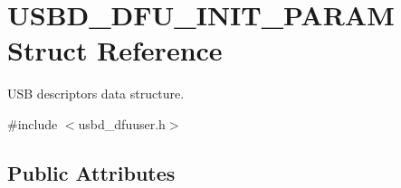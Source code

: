 \hypertarget{struct_u_s_b_d___d_f_u___i_n_i_t___p_a_r_a_m}{}\section{U\+S\+B\+D\+\_\+\+D\+F\+U\+\_\+\+I\+N\+I\+T\+\_\+\+P\+A\+R\+AM Struct Reference}
\label{struct_u_s_b_d___d_f_u___i_n_i_t___p_a_r_a_m}


U\+SB descriptors data structure.  




{\ttfamily \#include $<$usbd\+\_\+dfuuser.\+h$>$}

\subsection*{Public Attributes}

